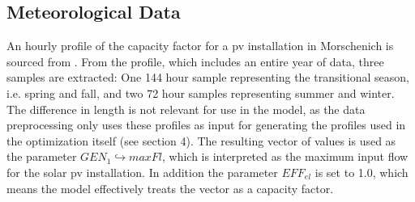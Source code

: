 \documentclass[
	11pt,								%
	DIV10,								%
	a4paper,         					%
	oneside,							%
	headheight=20pt,					%
	footheight=20pt,					%
    parskip=full,						%
    listof=totoc,						%
	bibliography=totoc,					%
	index=totoc,						%
]{scrartcl}
\begin{document}
\subsection{Meteorological Data}
An hourly profile of the capacity factor for a pv installation in Morschenich is sourced from \cite{pfenningerLongtermPatternsEuropean2016}. From the profile, which includes an entire year of data, three samples are extracted: One 144 hour sample representing the transitional season, i.e. spring and fall, and two 72 hour samples representing summer and winter. The difference in length is not relevant for use in the model, as the data preprocessing only uses these profiles as input for generating the profiles used in the optimization itself (see section 4). The resulting vector of values is used as the parameter $GEN_1 \hookrightarrow maxFl$, which is interpreted as the maximum input flow for the solar pv installation. In addition the parameter $EFF_{el}$ is set to 1.0, which means the model effectively treats the vector as a capacity factor.
\end{document}
